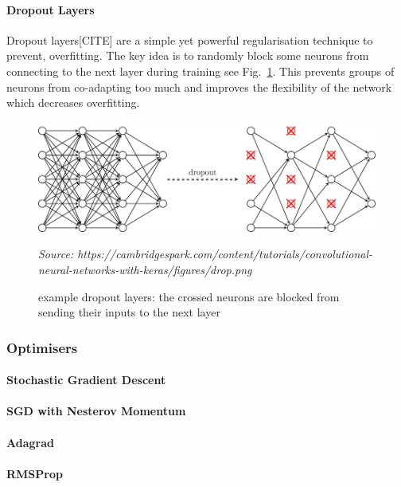 \documentclass[12pt,twoside]{article}
\newcommand{\source}[1]{\vspace{-3pt} \caption*{ \footnotesize{\textit{Source: {#1}}}} }
\begin{document}
\paragraph{Dropout Layers}

Dropout layers[CITE] are a simple yet powerful regularisation technique to prevent,
overfitting. The key idea is to randomly block some neurons from connecting to
the next layer during training see Fig.~\ref{fig:dropout}. This prevents groups of neurons from
co-adapting too much and improves the flexibility of the network which
decreases overfitting.


\begin{figure}[ht]
  \centering
  \includegraphics[scale=1]{./figures/dropout.png}
  \caption{example dropout layers: the crossed neurons are blocked from sending
  their inputs to the next layer}
  \source{https://cambridgespark.com/content/tutorials/convolutional-neural-networks-with-keras/figures/drop.png}
  \label{fig:dropout}
\end{figure}


\subsubsection{Optimisers}

\paragraph{Stochastic Gradient Descent}

\paragraph{SGD with Nesterov Momentum}

\paragraph{Adagrad}

\paragraph{RMSProp}
\end{document}
